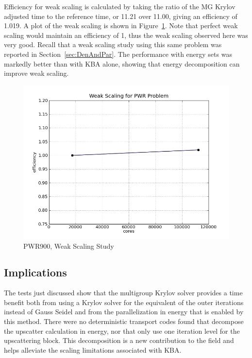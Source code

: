 Efficiency for weak scaling is calculated by taking the ratio of the MG Krylov adjusted time to the reference time, or 11.21 over 11.00, giving an efficiency of 1.019. A plot of the weak scaling is shown in Figure~\ref{fig:PWRweakScaling}. Note that perfect weak scaling would maintain an efficiency of 1, thus the weak scaling observed here was very good. Recall that a weak scaling study using this same problem was reported in Section~\ref{sec:DenAndPar}. The performance with energy sets was markedly better than with KBA alone, showing that energy decomposition can improve weak scaling.
%
\begin{figure}[!h]
  \begin{center}
    \includegraphics [width=.8\textwidth, height=0.48\textheight ] {PWRmyWeakScaling}
  \end{center}
  \caption{PWR900, Weak Scaling Study}
  \label{fig:PWRweakScaling}
\end{figure}

\subsection{Implications}
The tests just discussed show that the multigroup Krylov solver provides a time benefit both from using a Krylov solver for the equivalent of the outer iterations instead of Gauss Seidel and from the parallelization in energy that is enabled by this method. There were no deterministic transport codes found that decompose the upscatter calculation in energy, nor that only use one iteration level for the upscattering block. This decomposition is a new contribution to the field and helps alleviate the scaling limitations associated with KBA.   

